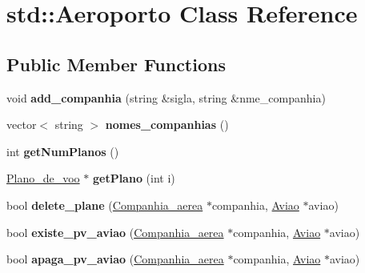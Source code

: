\hypertarget{classstd_1_1_aeroporto}{
\section{std::Aeroporto Class Reference}
\label{classstd_1_1_aeroporto}
}
\subsection*{Public Member Functions}
\begin{DoxyCompactItemize}
\item 
\hypertarget{classstd_1_1_aeroporto_a3b274e496f199a159d28134d7bfea512}{
void {\bfseries add\_\-companhia} (string \&sigla, string \&nme\_\-companhia)}
\label{classstd_1_1_aeroporto_a3b274e496f199a159d28134d7bfea512}

\item 
\hypertarget{classstd_1_1_aeroporto_a60d6df051fc7058f0141d73810262aa9}{
vector$<$ string $>$ {\bfseries nomes\_\-companhias} ()}
\label{classstd_1_1_aeroporto_a60d6df051fc7058f0141d73810262aa9}

\item 
\hypertarget{classstd_1_1_aeroporto_a89834b13666a3b79770c9afb7ff0b1d1}{
int {\bfseries getNumPlanos} ()}
\label{classstd_1_1_aeroporto_a89834b13666a3b79770c9afb7ff0b1d1}

\item 
\hypertarget{classstd_1_1_aeroporto_a37d9b04823709155838a5f27c9b98f33}{
\hyperlink{class_plano__de__voo}{Plano\_\-de\_\-voo} $\ast$ {\bfseries getPlano} (int i)}
\label{classstd_1_1_aeroporto_a37d9b04823709155838a5f27c9b98f33}

\item 
\hypertarget{classstd_1_1_aeroporto_a2466f3f2e9a5492186202021d2a55a40}{
bool {\bfseries delete\_\-plane} (\hyperlink{class_companhia__aerea}{Companhia\_\-aerea} $\ast$companhia, \hyperlink{class_aviao}{Aviao} $\ast$aviao)}
\label{classstd_1_1_aeroporto_a2466f3f2e9a5492186202021d2a55a40}

\item 
\hypertarget{classstd_1_1_aeroporto_a848bafdcf2ee89c3bced73872e869d02}{
bool {\bfseries existe\_\-pv\_\-aviao} (\hyperlink{class_companhia__aerea}{Companhia\_\-aerea} $\ast$companhia, \hyperlink{class_aviao}{Aviao} $\ast$aviao)}
\label{classstd_1_1_aeroporto_a848bafdcf2ee89c3bced73872e869d02}

\item 
\hypertarget{classstd_1_1_aeroporto_af1f8db715846970f5d880e59bda6726d}{
bool {\bfseries apaga\_\-pv\_\-aviao} (\hyperlink{class_companhia__aerea}{Companhia\_\-aerea} $\ast$companhia, \hyperlink{class_aviao}{Aviao} $\ast$aviao)}
\label{classstd_1_1_aeroporto_af1f8db715846970f5d880e59bda6726d}


\end{DoxyCompactItemize}
